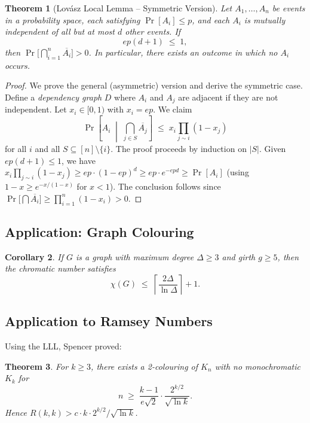 \documentclass[12pt,a4paper]{amsart}
\newtheorem{theorem}{Theorem}[section]
\newtheorem{corollary}[theorem]{Corollary}
\theoremstyle{definition}
\theoremstyle{remark}
\begin{document}
\begin{theorem}[Lov\'asz Local Lemma -- Symmetric Version]\label{thm:lll}
Let $A_1, \ldots, A_n$ be events in a probability space, each satisfying
$\Pr[A_i] \le p$, and each $A_i$ is mutually independent of all but at most $d$
other events.  If
\[
  e p (d+1) \;\le\; 1,
\]
then $\Pr\bigl[\bigcap_{i=1}^n \overline{A_i}\bigr] > 0$.  In particular, there
exists an outcome in which no $A_i$ occurs.
\end{theorem}

\begin{proof}
We prove the general (asymmetric) version and derive the symmetric case.
Define a \emph{dependency graph} $D$ where $A_i$ and $A_j$ are adjacent if they
are not independent.  Let $x_i \in [0,1)$ with $x_i = ep$.  We claim
\[
  \Pr\left[A_i \;\middle|\; \bigcap_{j \in S} \overline{A_j}\right]
  \;\le\; x_i \prod_{j \sim i} (1-x_j)
\]
for all $i$ and all $S \subseteq [n] \setminus \{i\}$.  The proof proceeds by
induction on $|S|$.  Given $ep(d+1) \le 1$, we have $x_i \prod_{j\sim i}(1-x_j)
\ge ep \cdot (1-ep)^d \ge ep \cdot e^{-epd} \ge \Pr[A_i]$ (using $1-x \ge e^{-x/(1-x)}$
for $x < 1$).  The conclusion follows since
$\Pr\bigl[\bigcap \overline{A_i}\bigr] \ge \prod_{i=1}^n (1-x_i) > 0$.
\end{proof}

\subsection{Application: Graph Colouring}

\begin{corollary}
If $G$ is a graph with maximum degree $\Delta \ge 3$ and girth $g \ge 5$, then
the chromatic number satisfies
\[
  \chi(G) \;\le\; \left\lceil \frac{2\Delta}{\ln \Delta} \right\rceil + 1.
\]
\end{corollary}

\subsection{Application to Ramsey Numbers}

Using the LLL, Spencer \cite{Spencer1975} proved:

\begin{theorem}
For $k \ge 3$, there exists a 2-colouring of $K_n$ with no monochromatic $K_k$
for
\[
  n \;\ge\; \frac{k-1}{e\sqrt{2}} \cdot \frac{2^{k/2}}{\sqrt{\ln k}}.
\]
Hence $R(k,k) > c \cdot k \cdot 2^{k/2} / \sqrt{\ln k}$.
\end{theorem}
\end{document}

